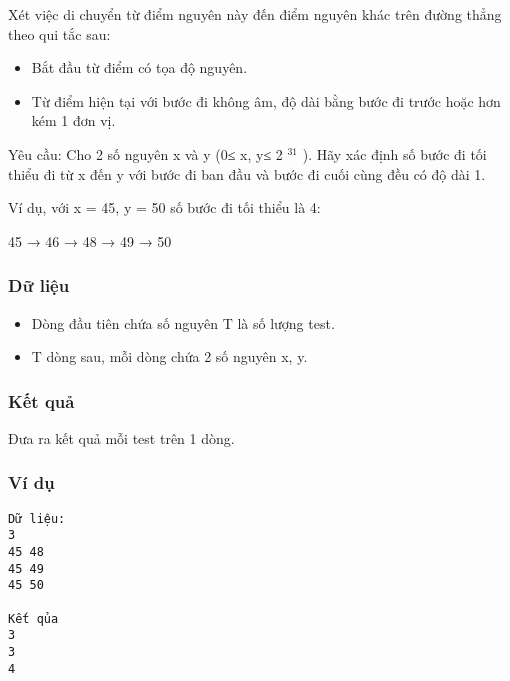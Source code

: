 

   Xét việc di chuyển từ điểm nguyên này đến điểm nguyên khác trên đường thẳng theo qui tắc sau:  
\begin{itemize}
	\item     Bắt đầu từ điểm có tọa độ nguyên.   
	\item     Từ điểm hiện tại với bước đi không âm, độ dài bằng bước đi trước hoặc hơn kém 1 đơn vị.   
\end{itemize}

   Yêu cầu: Cho 2 số nguyên x và y (0≤ x, y≤ 2   $^    31   $   ). Hãy xác định số bước đi tối thiểu đi từ x đến y với   bước đi ban đầu và bước đi cuối cùng đều có độ dài 1.  

   Ví dụ, với x = 45, y = 50 số bước đi tối thiểu là 4:  

   45 → 46 → 48 → 49 → 50  

\subsubsection{   Dữ liệu  }
\begin{itemize}
	\item     Dòng đầu tiên chứa số nguyên T là số lượng test.   
	\item     T dòng sau, mỗi dòng chứa 2 số nguyên x, y.   
\end{itemize}

\subsubsection{   Kết quả  }

   Đưa ra kết quả mỗi test trên 1 dòng.  

\subsubsection{   Ví dụ  }
\begin{verbatim}
Dữ liệu:
3
45 48
45 49
45 50

Kết qủa
3
3
4
\end{verbatim}